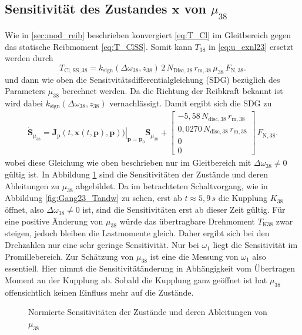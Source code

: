 \subsection{Sensitivität des Zustandes $\pmb{x}$ von $\mu_{38}$}\label{ssec:sens_mue38}
Wie in \ref{sec:mod_reib} beschrieben konvergiert \eqref{eq:T_Cl} im Gleitbereich gegen das statische Reibmoment \eqref{eq:T_ClSS}. Somit kann $T_{38}$ in \eqref{eq:u_exnl23} ersetzt werden durch
\begin{equation}
T_\mathrm{Cl,SS,38} = k_\mathrm{sign}(\Delta \omega_{38},z_{38})\,2\,N_{\mathrm{Disc,38}}\,r_{\mathrm{m},38}\,\mu_{38}\, F_\mathrm{N,38}.
\end{equation}
und dann wie oben die Sensitvitätsdifferentialgleichung (SDG) bezüglich des Parameters $\mu_{38}$ berechnet werden. Da die Richtung der Reibkraft bekannt ist wird dabei $k_\mathrm{sign}(\Delta \omega_{38},z_{38})$ vernachlässigt. Damit ergibt sich die SDG zu
\begin{align}
\dot{\pmb{S}}_{\mu_{38}} = \left. \pmb{J}_\mathrm{p}(t,\pmb{x}(t,\pmb{p}),\pmb{p}))\right|_{\pmb{p}=\pmb{p}_0} \pmb{S}_{\mu_{38}}
+ \begin{bmatrix} -5,58\,N_\mathrm{disc,38}\,r_{\mathrm{m},38} \\ 0,0270\,N_\mathrm{disc,38}\,r_{\mathrm{m},38} \\ 0 \\ 0 \end{bmatrix}\,F_\mathrm{N,38}.
\end{align}
wobei diese Gleichung wie oben beschrieben nur im Gleitbereich mit $\Delta \omega_{38}\neq 0$ gültig ist. In Abbildung \ref{fig:Sens_mu38} sind die Sensitivitäten der Zustände und deren Ableitungen zu $\mu_{38}$ abgebildet. Da im betrachteten Schaltvorgang, wie in Abbildung \ref{fig:Gang23_Tandw} zu sehen, erst ab $t \approx 5,9\, s$ die Kupplung $K_{38}$ öffnet, also $\Delta \omega_{38}\neq 0$ ist, sind die Sensitivitäten erst ab dieser Zeit gültig. Für eine positive Änderung von $\mu_{38}$ würde das übertragbare Drehmoment $T_\mathrm{K38}$ zwar steigen, jedoch bleiben die Lastmomente gleich. Daher ergibt sich bei den Drehzahlen nur eine sehr geringe Sensitivität. Nur bei $\omega_1$ liegt die Sensitivität im Promillebereich. Zur Schätzung von $\mu_{38}$ ist eine die Messung von $\omega_1$ also essentiell. Hier nimmt die Sensitivitätänderung in Abhängigkeit vom Übertragen Moment an der Kupplung ab. Sobald die Kupplung ganz geöffnet ist hat $\mu_{38}$ offensichtlich keinen Einfluss mehr auf die Zustände.
\begin{figure}
\centering
\newlength\muheight 
\setlength\muheight{8cm}
\newlength\muwidth 
\setlength\muwidth{13cm}

\caption{Normierte Sensitivitäten der Zustände und deren Ableitungen von $\mu_{38}$}
\label{fig:Sens_mu38}
\end{figure}

